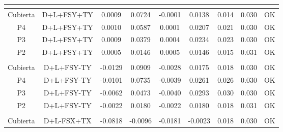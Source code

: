 \begin{table}[H]
{\begin{tabular}{|c|c|c|c|c|c|c|c|c|}
    \hline
    \multicolumn{1}{|r}{} & \multicolumn{1}{r}{} & \multicolumn{1}{r}{} & \multicolumn{1}{r}{} & \multicolumn{1}{r}{} & \multicolumn{1}{r}{} & \multicolumn{1}{r}{} & \multicolumn{1}{r}{} &  \bigstrut\\
    \hline
    Cubierta & D+L+FSY+TY & 0.0009 & 0.0724 & -0.0001 & 0.0138 & 0.014 & 0.030 & \cellcolor[rgb]{ .776,  .937,  .808}\textcolor[rgb]{ 0,  .38,  0}{OK} \bigstrut\\
    \hline
    P4  & D+L+FSY+TY & 0.0010 & 0.0587 & 0.0001 & 0.0207 & 0.021 & 0.030 & \cellcolor[rgb]{ .776,  .937,  .808}\textcolor[rgb]{ 0,  .38,  0}{OK} \bigstrut\\
    \hline
    P3  & D+L+FSY+TY & 0.0009 & 0.0379 & 0.0004 & 0.0234 & 0.023 & 0.030 & \cellcolor[rgb]{ .776,  .937,  .808}\textcolor[rgb]{ 0,  .38,  0}{OK} \bigstrut\\
    \hline
    P2  & D+L+FSY+TY & 0.0005 & 0.0146 & 0.0005 & 0.0146 & 0.015 & 0.031 & \cellcolor[rgb]{ .776,  .937,  .808}\textcolor[rgb]{ 0,  .38,  0}{OK} \bigstrut\\
    \hline
    \multicolumn{1}{|r}{} & \multicolumn{1}{r}{} & \multicolumn{1}{r}{} & \multicolumn{1}{r}{} & \multicolumn{1}{r}{} & \multicolumn{1}{r}{} & \multicolumn{1}{r}{} & \multicolumn{1}{r}{} &  \bigstrut\\
    \hline
    Cubierta & D+L+FSY-TY & -0.0129 & 0.0909 & -0.0028 & 0.0175 & 0.018 & 0.030 & \cellcolor[rgb]{ .776,  .937,  .808}\textcolor[rgb]{ 0,  .38,  0}{OK} \bigstrut\\
    \hline
    P4  & D+L+FSY-TY & -0.0101 & 0.0735 & -0.0039 & 0.0261 & 0.026 & 0.030 & \cellcolor[rgb]{ .776,  .937,  .808}\textcolor[rgb]{ 0,  .38,  0}{OK} \bigstrut\\
    \hline
    P3  & D+L+FSY-TY & -0.0062 & 0.0473 & -0.0040 & 0.0293 & 0.030 & 0.030 & \cellcolor[rgb]{ .776,  .937,  .808}\textcolor[rgb]{ 0,  .38,  0}{OK} \bigstrut\\
    \hline
    P2  & D+L+FSY-TY & -0.0022 & 0.0180 & -0.0022 & 0.0180 & 0.018 & 0.031 & \cellcolor[rgb]{ .776,  .937,  .808}\textcolor[rgb]{ 0,  .38,  0}{OK} \bigstrut\\
    \hline
    \multicolumn{1}{|r}{} & \multicolumn{1}{r}{} & \multicolumn{1}{r}{} & \multicolumn{1}{r}{} & \multicolumn{1}{r}{} & \multicolumn{1}{r}{} & \multicolumn{1}{r}{} & \multicolumn{1}{r}{} &  \bigstrut\\
    \hline
    Cubierta & D+L-FSX+TX & -0.0818 & -0.0096 & -0.0181 & -0.0023 & 0.018 & 0.030 & \cellcolor[rgb]{ .776,  .937,  .808}\textcolor[rgb]{ 0,  .38,  0}{OK} \bigstrut\\

\end{tabular}}
\end{table}
